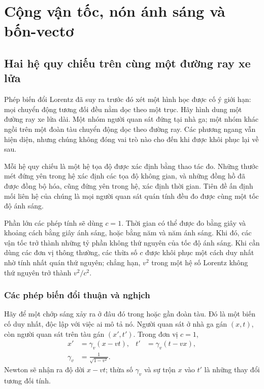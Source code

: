 \chapter{Cộng vận tốc, nón ánh sáng và bốn-vectơ}

\section{Hai hệ quy chiếu trên cùng một đường ray xe lửa}

Phép biến đổi Lorentz đã suy ra trước đó xét một hình học được cố ý giới hạn: mọi chuyển động tương đối đều nằm dọc theo một trục. Hãy hình dung một đường ray xe lửa dài. Một nhóm người quan sát đứng tại nhà ga; một nhóm khác ngồi trên một đoàn tàu chuyển động dọc theo đường ray. Các phương ngang vẫn hiện diện, nhưng chúng không đóng vai trò nào cho đến khi được khôi phục lại về sau.

Mỗi hệ quy chiếu là một hệ tọa độ được xác định bằng thao tác đo. Những thước mét đứng yên trong hệ xác định các tọa độ không gian, và những đồng hồ đã được đồng bộ hóa, cũng đứng yên trong hệ, xác định thời gian. Tiên đề ấn định mối liên hệ của chúng là mọi người quan sát quán tính đều đo được cùng một tốc độ ánh sáng.

Phần lớn các phép tính sẽ dùng \(c=1\). Thời gian có thể được đo bằng giây và khoảng cách bằng giây ánh sáng, hoặc bằng năm và năm ánh sáng. Khi đó, các vận tốc trở thành những tỷ phần không thứ nguyên của tốc độ ánh sáng. Khi cần dùng các đơn vị thông thường, các thừa số \(c\) được khôi phục một cách duy nhất nhờ tính nhất quán thứ nguyên; chẳng hạn, \(v^2\) trong một hệ số Lorentz không thứ nguyên trở thành \(v^2/c^2\).

\subsection{Các phép biến đổi thuận và nghịch}

Hãy để một chớp sáng xảy ra ở đâu đó trong hoặc gần đoàn tàu. Đó là một biến cố duy nhất, độc lập với việc ai mô tả nó. Người quan sát ở nhà ga gán \((x,t)\), còn người quan sát trên tàu gán \((x',t')\). Trong đơn vị \(c=1\),
\begin{align}
x'&=\gamma_v(x-vt),&
t'&=\gamma_v(t-vx),
\label{eq:sr2-direct}\\
\gamma_v&=\frac{1}{\sqrt{1-v^2}}.
\end{align}
Newton sẽ nhận ra độ dời \(x-vt\); thừa số \(\gamma_v\) và sự trộn \(x\) vào \(t'\) là những thay đổi tương đối tính.

